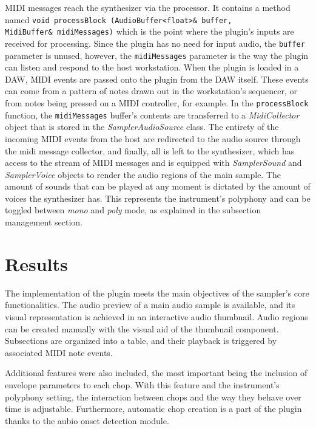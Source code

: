 \documentclass[12pt, a4paper, hidelinks]{article}
\begin{document}
	MIDI messages reach the synthesizer via the processor. It contains a method named \texttt{void processBlock (AudioBuffer<float>\& buffer, \\
	MidiBuffer\& midiMessages)} which is the point where the plugin's inputs are received for processing. Since the plugin has no need for input audio, the \texttt{buffer} parameter is unused, however, the \texttt{midiMessages} parameter is the way the plugin can listen and respond to the host workstation. When the plugin is loaded in a DAW, MIDI events are passed onto the plugin from the DAW itself. These events can come from a pattern of notes drawn out in the workstation's sequencer, or from notes being pressed on a MIDI controller, for example. In the \texttt{processBlock} function, the \texttt{midiMessages} buffer's contents are transferred to a \textit{MidiCollector} object that is stored in the \textit{SamplerAudioSource} class. The entirety of the incoming MIDI events from the host are redirected to the audio source through the midi message collector, and finally, all is left to the synthesizer, which has access to the stream of MIDI messages and is equipped with \textit{SamplerSound} and \textit{SamplerVoice} objects to render the audio regions of the main sample. The amount of sounds that can be played at any moment is dictated by the amount of voices the synthesizer has. This represents the instrument's polyphony and can be toggled between \textit{mono} and \textit{poly} mode, as explained in the subsection management section.
	\par
	
			
	\newpage
	\section{Results}
	The implementation of the plugin meets the main objectives of the sampler's core functionalities. The audio preview of a main audio sample is available, and its visual representation is achieved in an interactive audio thumbnail. Audio regions can be created manually with the visual aid of the thumbnail component. Subsections are organized into a table, and their playback is triggered by associated MIDI note events. \par 
	Additional features were also included, the most important being the inclusion of envelope parameters to each chop. With this feature and the instrument's polyphony setting, the interaction between chops and the way they behave over time is adjustable. Furthermore, automatic chop creation is a part of the plugin thanks to the aubio onset detection module\cite{aubioonset}.\par
	
\end{document}
